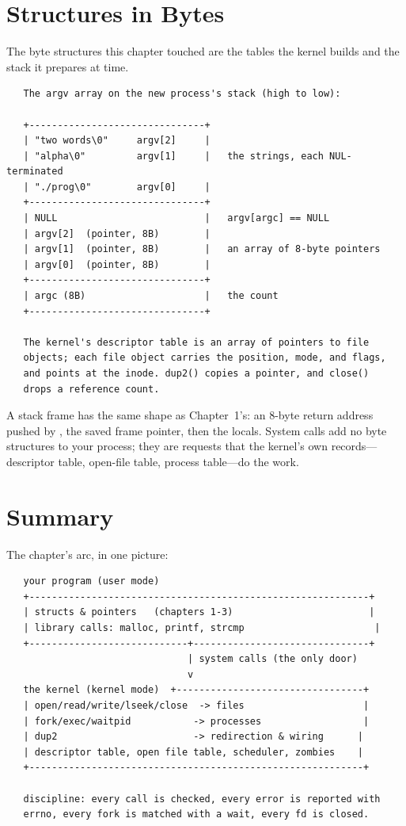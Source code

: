 \section{Structures in Bytes}

The byte structures this chapter touched are the tables the kernel
builds and the stack it prepares at  time.

\begin{verbatim}
   The argv array on the new process's stack (high to low):

   +-------------------------------+
   | "two words\0"     argv[2]     |
   | "alpha\0"         argv[1]     |   the strings, each NUL-terminated
   | "./prog\0"        argv[0]     |
   +-------------------------------+
   | NULL                          |   argv[argc] == NULL
   | argv[2]  (pointer, 8B)        |
   | argv[1]  (pointer, 8B)        |   an array of 8-byte pointers
   | argv[0]  (pointer, 8B)        |
   +-------------------------------+
   | argc (8B)                     |   the count
   +-------------------------------+

   The kernel's descriptor table is an array of pointers to file
   objects; each file object carries the position, mode, and flags,
   and points at the inode. dup2() copies a pointer, and close()
   drops a reference count.
\end{verbatim}

A stack frame has the same shape as Chapter~1's: an 8-byte return
address pushed by , the saved frame pointer, then the
locals. System calls add no byte structures to your process; they are
requests that the kernel's own records---descriptor table, open-file
table, process table---do the work.

\section{Summary}

The chapter's arc, in one picture:

\begin{verbatim}
   your program (user mode)
   +------------------------------------------------------------+
   | structs & pointers   (chapters 1-3)                        |
   | library calls: malloc, printf, strcmp                       |
   +----------------------------+-------------------------------+
                                | system calls (the only door)
                                v
   the kernel (kernel mode)  +---------------------------------+
   | open/read/write/lseek/close  -> files                     |
   | fork/exec/waitpid           -> processes                  |
   | dup2                        -> redirection & wiring      |
   | descriptor table, open file table, scheduler, zombies    |
   +-----------------------------------------------------------+

   discipline: every call is checked, every error is reported with
   errno, every fork is matched with a wait, every fd is closed.
\end{verbatim}

